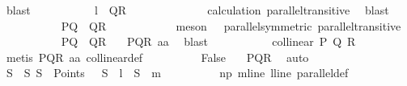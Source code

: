 \begin{isabellebody}
\ blast\isanewline
\ \ \ \ \ \ \ \ \isamarkupfalse%
\ {}{\isacharcolon}{\kern0pt}\ {\isachardoublequoteopen}{\isacharquery}{\kern0pt}l\ {\isacharbar}{\kern0pt}{\isacharbar}{\kern0pt}\ {\isacharquery}{\kern0pt}QR{\isachardoublequoteclose}\ \isanewline
\ \ \ \ \ \ \ \ \ \ \isamarkupfalse%
\ {\isachardoublequoteopen}{}{\isachardoublequoteclose}\ calculation\ parallel{\isacharunderscore}{\kern0pt}transitive\ \isamarkupfalse%
\ blast\isanewline
\ \ \ \ \ \ \ \ \isamarkupfalse%
\ {}{\isacharcolon}{\kern0pt}\ {\isachardoublequoteopen}{\isacharquery}{\kern0pt}PQ\ {\isacharbar}{\kern0pt}{\isacharbar}{\kern0pt}\ {\isacharquery}{\kern0pt}QR{\isachardoublequoteclose}\isanewline
\ \ \ \ \ \ \ \ \ \ \isamarkupfalse%
\ {\isacharparenleft}{\kern0pt}meson\ {\isachardoublequoteopen}{}{\isachardoublequoteclose}\ {\isachardoublequoteopen}{}{\isachardoublequoteclose}\ parallel{\isacharunderscore}{\kern0pt}symmetric\ parallel{\isacharunderscore}{\kern0pt}transitive{}{\isacharparenright}{\kern0pt}\isanewline
\ \ \ \ \ \ \ \ \isamarkupfalse%
\ {}{\isacharcolon}{\kern0pt}\ {\isachardoublequoteopen}{\isacharquery}{\kern0pt}PQ\ {\isacharequal}{\kern0pt}\ {\isacharquery}{\kern0pt}QR{\isachardoublequoteclose}\ \isamarkupfalse%
\ {\isachardoublequoteopen}{}{\isachardoublequoteclose}\ PQR\ a{}a\ \isamarkupfalse%
\ blast\isanewline
\ \ \ \ \ \ \ \ \isamarkupfalse%
\ {}{\isacharcolon}{\kern0pt}\ {\isachardoublequoteopen}collinear\ P\ Q\ R{\isachardoublequoteclose}\ \isamarkupfalse%
\ {}\ \isamarkupfalse%
\ {\isacharparenleft}{\kern0pt}metis\ PQR\ a{}a\ collinear{\isacharunderscore}{\kern0pt}def{\isacharparenright}{\kern0pt}\isanewline
\ \ \ \ \ \ \ \ \isamarkupfalse%
\ False\ \isamarkupfalse%
\ {}\ PQR\ \isamarkupfalse%
\ auto\isanewline
\ \ \ \ \ \ \isamarkupfalse%
\isanewline
\ \ \ \ \ \ \isamarkupfalse%
\ S\ \ S{\isacharcolon}{\kern0pt}\ {\isachardoublequoteopen}S\ {\isasymin}\ Points\ {\isasymand}\ \ S\ {\isasymlhd}\ {\isacharquery}{\kern0pt}l\ {\isasymand}\ S\ {\isasymlhd}\ {\isacharquery}{\kern0pt}m{\isachardoublequoteclose}\isanewline
\ \ \ \ \ \ \ \ \isamarkupfalse%
\ np\ mline\ lline\ parallel{\isacharunderscore}{\kern0pt}def\ \isamarkupfalse%

\end{isabellebody}
